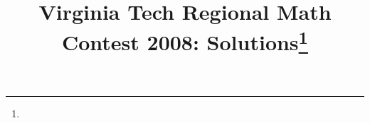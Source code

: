\documentclass[10pt]{article}
\begin{document}
\title{Virginia Tech Regional Math Contest 2008: Solutions\footnote{\disclaimer}}
\author{\vspace{-2ex}}
\date{\vspace{-5ex}} %
\maketitle

%

%

%

%

%

%

%
\end{document}
